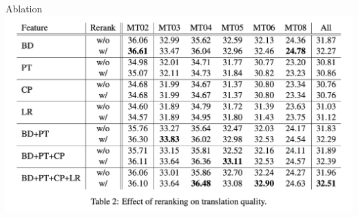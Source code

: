 \documentclass{beamer}
\begin{document}
\begin{frame}{Ablation}{}
\centering
\includegraphics[width=\textheight]{ablation}
\end{frame}
\end{document}
